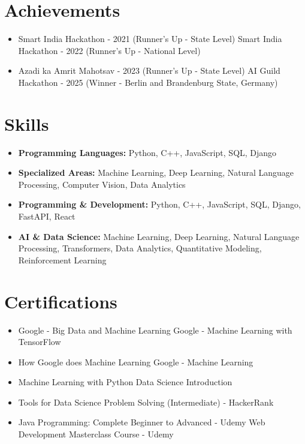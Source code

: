 \documentclass[a4paper,10pt]{article}
\begin{document}
\section*{Achievements}
\begin{itemize}
\item Smart India Hackathon - 2021 (Runner's Up - State Level) \hfill Smart India Hackathon - 2022 (Runner's Up - National Level)
\item Azadi ka Amrit Mahotsav - 2023 (Runner's Up - State Level) \hfill AI Guild Hackathon - 2025 (Winner - Berlin and Brandenburg State, Germany)
\end{itemize}

\section*{Skills}
\begin{itemize}
  \item \textbf{Programming Languages:} Python, C++, JavaScript, SQL, Django
  \item \textbf{Specialized Areas:} Machine Learning, Deep Learning, Natural Language Processing, Computer Vision, Data Analytics
  \item \textbf{Programming \& Development:} Python, C++, JavaScript, SQL, Django, FastAPI, React
  \item \textbf{AI \& Data Science:} Machine Learning, Deep Learning, Natural Language Processing, Transformers, Data Analytics, Quantitative Modeling, Reinforcement Learning
\end{itemize}

\section*{Certifications}
\begin{itemize}
\item Google - Big Data and Machine Learning \hfill Google - Machine Learning with TensorFlow
\item How Google does Machine Learning \hfill Google - Machine Learning
\item Machine Learning with Python \hfill Data Science Introduction
\item Tools for Data Science \hfill Problem Solving (Intermediate) - HackerRank
\item Java Programming: Complete Beginner to Advanced - Udemy \hfill Web Development Masterclass Course - Udemy
\end{itemize}
\end{document}
